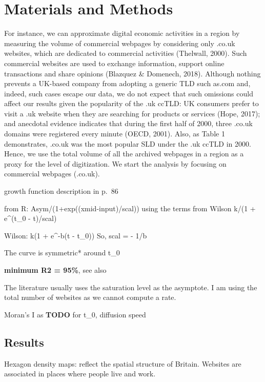 \documentclass[
  authoryear,
  preprint,
  3p]{elsarticle}
\begin{document}
\hypertarget{sec3}{%
\section{Materials and Methods}\label{sec3}}

For instance, we can approximate digital economic activities in a region
by measuring the volume of commercial webpages by considering only
.co.uk websites, which are dedicated to commercial activities (Thelwall,
2000). Such commercial websites are used to exchange information,
support online transactions and share opinions (Blazquez \& Domenech,
2018). Although nothing prevents a UK-based company from adopting a
generic TLD such as.com and, indeed, such cases escape our data, we do
not expect that such omissions could affect our results given the
popularity of the .uk ccTLD: UK consumers prefer to visit a .uk website
when they are searching for products or services (Hope, 2017); and
anecdotal evidence indicates that during the first half of 2000, three
.co.uk domains were registered every minute (OECD, 2001). Also, as Table
1 demonstrates, .co.uk was the most popular SLD under the .uk ccTLD in
2000. Hence, we use the total volume of all the archived webpages in a
region as a proxy for the level of digitization. We start the analysis
by focusing on commercial webpages (.co.uk).

\citet{wilson201281} growth function description in p.~86

from R: Asym/(1+exp((xmid-input)/scal)) using the terms from Wilson k/(1
+ e\^{}(t\_0 - t)/scal)

Wilson: k(1 + e\^{}-b(t - t\_0)) So, scal = - 1/b

The curve is symmetric* around t\_0

\textbf{minimum R2 = 95\%}, see also \citet{grubler1990rise}

The literature usually uses the saturation level as the asymptote. I am
using the total number of websites as we cannot compute a rate.

Moran's I as \citet{ding2010modeling} \textbf{TODO} for t\_0, diffusion
speed

\hypertarget{sec3.1}{%
\subsection{Results}\label{sec3.1}}

Hexagon density maps: reflect the spatial structure of Britain. Websites
are associated in places where people live and work.
\end{document}
